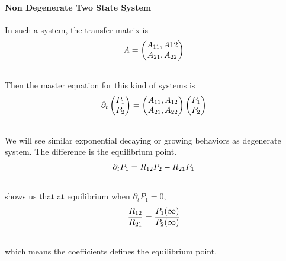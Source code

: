 \documentclass[letterpaper,10pt,english]{sphinxmanual}
\begin{document}
\paragraph{Non Degenerate Two State System}
\label{nonequilibrium/week9:non-degenerate-two-state-system}
In such a system, the transfer matrix is
\begin{gather}
\begin{split}A = \begin{pmatrix}A_{11}, A{12} \\ A_{21}, A_{22}\end{pmatrix}\end{split}\notag\\\begin{split}\end{split}\notag
\end{gather}
Then the master equation for this kind of systems is
\begin{gather}
\begin{split}\partial_t \begin{pmatrix}P_1 \\ P_2 \end{pmatrix} = \begin{pmatrix}A_{11}, A_{12}\\ A_{21}, A_{22} \end{pmatrix} \begin{pmatrix}P_1 \\ P_2 \end{pmatrix}\end{split}\notag\\\begin{split}\end{split}\notag
\end{gather}
We will see similar exponential decaying or growing behaviors as degenerate system. The difference is the equilibrium point.
\begin{gather}
\begin{split}\partial_t P_1 = R_{12} P_2 - R_{21} P_1\end{split}\notag\\\begin{split}\end{split}\notag
\end{gather}
shows us that at equilibrium when $\partial_t P_1 = 0$,
\begin{gather}
\begin{split}\frac{R_{12}}{R_{21}} = \frac{P_1(\infty)}{P_2(\infty)}\end{split}\notag\\\begin{split}\end{split}\notag
\end{gather}
which means the coefficients defines the equilibrium point.
\end{document}
